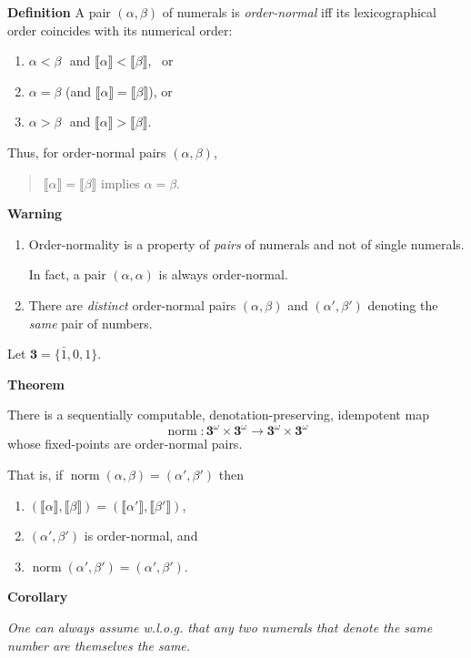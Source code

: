 \documentclass{csslides-1.1}
\newcommand{\Meaning}[1]{\llbracket #1 \rrbracket}
\newcommand{\norm}{\operatorname{norm}}
\newcommand{\three}{\mathbf{3}}
\newcommand{\thomega}{{\three}^{\omega}}
\newcommand{\myemph}[1]{{\it #1}\/}
\begin{document}
\begin{slide}{}

{\bf Definition}
A pair $(\alpha,\beta)$ of numerals is \myemph{order-normal} iff
its lexicographical order coincides with its numerical order:
\begin{enumerate}
\item $\alpha < \beta$ \,\,and $\Meaning{\alpha} < \Meaning{\beta}$, \,\,\,or
\item $\alpha = \beta$ (and $\Meaning{\alpha} = \Meaning{\beta}$), or
\item $\alpha > \beta$ \,\,and $\Meaning{\alpha} > \Meaning{\beta}$. 
\end{enumerate}

Thus, for order-normal pairs $(\alpha,\beta)$, 
\begin{quote}
$\Meaning{\alpha}=\Meaning{\beta}$ implies $\alpha=\beta$.
\end{quote} 
{\bf Warning} 
\begin{enumerate}
\item Order-normality is a property of \myemph{pairs} of numerals and
  not of single numerals.

In fact, a pair $(\alpha,\alpha)$ is always order-normal.

\item There are \myemph{distinct} order-normal pairs $(\alpha,\beta)$
  and $(\alpha',\beta')$ denoting the \myemph{same} pair of numbers.
\end{enumerate}
\end{slide}

\begin{slide}{}

Let $\three=\{\bar{1},0,1\}$.

\vfill

  {\bf Theorem} 

  \begin{it}
  There is a sequentially computable,
  denotation-preserving, idempotent map
  \[
  \norm:\thomega \times \thomega \rightarrow \thomega \times \thomega
  \]
  whose fixed-points are order-normal pairs.
  \end{it}


\vfill

That is, if
$\norm(\alpha,\beta)=(\alpha',\beta')$ then
\begin{enumerate}
\item
  $(\Meaning{\alpha},\Meaning{\beta})=(\Meaning{\alpha'},\Meaning{\beta'})$,
\item $(\alpha',\beta')$ is order-normal, and
\item $\norm(\alpha',\beta')=(\alpha',\beta')$.
\end{enumerate}

{\bf Corollary}

\myemph{One can always assume w.l.o.g. that any two numerals that
  denote the same number are themselves the same.}
\end{slide}
\end{document}

